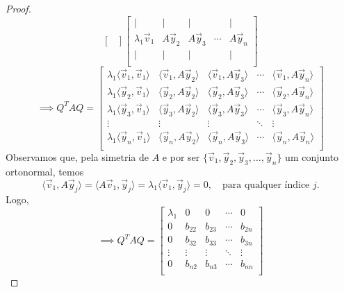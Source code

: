 \documentclass[../livro.tex]{subfiles}
\begin{document}
\begin{proof}
\begin{equation}
\begin{bmatrix}
	\end{bmatrix}
	\begin{bmatrix}
	| & | & | & & | \\
	\lambda_1 \vec{v}_1 & A \vec{y}_2 & A \vec{y}_3 & \cdots &  A\vec{y}_n \\
	| & | & | & & | \\
	\end{bmatrix}
	\end{equation}
	\begin{equation}
	\implies Q^TAQ =
	\begin{bmatrix}
	\lambda_1\langle \vec{v}_1, \vec{v}_1 \rangle & \langle \vec{v}_1, A\vec{y}_2 \rangle & \langle \vec{v}_1, A\vec{y}_3 \rangle & \cdots & \langle \vec{v}_1, A\vec{y}_n \rangle \\
	\lambda_1\langle \vec{y}_2, \vec{v}_1 \rangle & \langle \vec{y}_2, A\vec{y}_2 \rangle & \langle \vec{y}_2, A\vec{y}_3 \rangle & \cdots & \langle \vec{y}_2, A\vec{y}_n \rangle \\
	\lambda_1\langle \vec{y}_3, \vec{v}_1 \rangle & \langle \vec{y}_3, A\vec{y}_2 \rangle & \langle \vec{y}_3, A\vec{y}_3 \rangle & \cdots & \langle \vec{y}_3, A\vec{y}_n \rangle \\
	\vdots & \vdots & \vdots & \ddots & \vdots \\
	\lambda_1\langle \vec{y}_n, \vec{v}_1 \rangle & \langle \vec{y}_n, A\vec{y}_2 \rangle & \langle \vec{y}_n, A\vec{y}_3 \rangle & \cdots & \langle \vec{y}_n, A\vec{y}_n \rangle \\
	\end{bmatrix}
	\end{equation} Observamos que, pela simetria de $A$ e por ser $	\{ \vec{v}_1, \vec{y}_2, \vec{y}_3, \dots, \vec{y}_n \}$ um conjunto ortonormal, temos 
	\begin{equation}
	\langle \vec{v}_1, A\vec{y}_j \rangle = \langle A\vec{v}_1, \vec{y}_j \rangle = \lambda_1 \langle \vec{v}_1, \vec{y}_j \rangle = 0, \quad \text{para qualquer índice } j.
	\end{equation}Logo,
	\begin{equation}
	\implies Q^TAQ =
	\begin{bmatrix}
	\lambda_1 & 0 & 0 & \cdots & 0 \\
	0 & b_{22} & b_{23} & \cdots & b_{2n} \\
	0 & b_{32} & b_{33} & \cdots & b_{3n} \\
	\vdots & \vdots & \vdots & \ddots & \vdots \\
	0 & b_{n2} & b_{n3} & \cdots & b_{nn} \\

\end{bmatrix}
\end{equation}
\end{proof}
\end{document}
